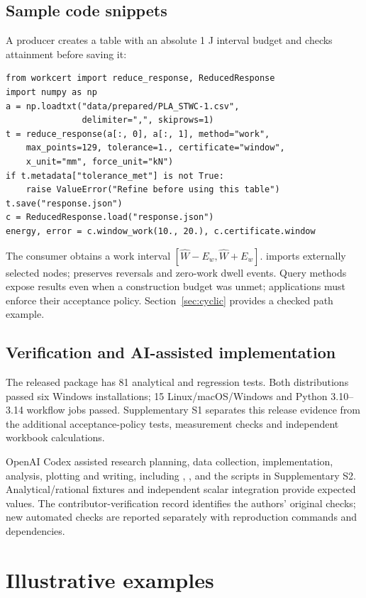 \documentclass[preprint,12pt,a4paper]{elsarticle}
\begin{document}
\subsection{Sample code snippets}
A producer creates a table with an absolute 1 J interval budget and checks attainment before saving it:
{\small
\begin{verbatim}
from workcert import reduce_response, ReducedResponse
import numpy as np
a = np.loadtxt("data/prepared/PLA_STWC-1.csv",
               delimiter=",", skiprows=1)
t = reduce_response(a[:, 0], a[:, 1], method="work",
    max_points=129, tolerance=1., certificate="window",
    x_unit="mm", force_unit="kN")
if t.metadata["tolerance_met"] is not True:
    raise ValueError("Refine before using this table")
t.save("response.json")
c = ReducedResponse.load("response.json")
energy, error = c.window_work(10., 20.), c.certificate.window
\end{verbatim}
}
The consumer obtains a work interval $[\widehat W-E_w,\widehat W+E_w]$.  imports externally selected nodes;  preserves reversals and zero-work dwell events. Query methods expose results even when a construction budget was unmet; applications must enforce their acceptance policy. Section~\ref{sec:cyclic} provides a checked path example.

\subsection{Verification and AI-assisted implementation}
The released package has 81 analytical and regression tests. Both distributions passed six Windows installations; 15 Linux/macOS/Windows and Python 3.10--3.14 workflow jobs passed. Supplementary S1 separates this release evidence from the additional acceptance-policy tests, measurement checks and independent workbook calculations.

OpenAI Codex assisted research planning, data collection, implementation, analysis, plotting and writing, including , ,  and the scripts in Supplementary S2. Analytical/rational fixtures and independent scalar integration provide expected values. The contributor-verification record identifies the authors' original checks; new automated checks are reported separately with reproduction commands and dependencies.

\section{Illustrative examples}
\end{document}
